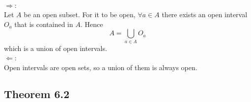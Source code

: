 
\begin{solution}
 \\$\Rightarrow$: \\
 Let $A$ be an open subset. For it to be open, $\forall a \in A$ there exists an open interval $O_a$ that is contained in $A$. Hence
 $$A = \bigcup_{a \in A} O_a$$
 which is a union of open intervals. \\
 $\Leftarrow$: \\
 Open intervals are open sets, so a union of them is always open.
\end{solution}

\subsection{Theorem 6.2}

